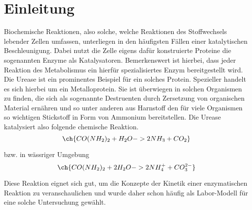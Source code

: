 %
%

\section{Einleitung}
Biochemische Reaktionen, also solche, welche Reaktionen des Stoffwechsels lebender Zellen umfassen, unterliegen in den häufigsten Fällen einer katalytischen Beschleunigung. Dabei nutzt die Zelle eigens dafür konstruierte Proteine die sogenannten Enzyme als Katalysatoren. Bemerkenswert ist hierbei, dass jeder Reaktion des Metabolismus ein hierfür spezialisiertes Enzym bereitgestellt wird. Die Urease ist ein prominentes Beispiel für ein solches Protein. Spezieller handelt es sich hierbei um ein Metalloprotein. Sie ist überwiegen in solchen Organismen zu finden, die sich als sogenannte Destruenten durch Zersetzung von organischen Material ernähren und so unter anderen aus Harnstoff den für viele Organismen so wichtigen Stickstoff in Form von Ammonium bereitstellen. Die Urease katalysiert also folgende chemische Reaktion.
\begin{equation}
\ch{CO(NH_2)_2 +  H_2O -> 2 NH_3 + CO_2}
\end{equation}

bzw. in wässriger Umgebung 
\begin{equation}
\ch{CO(NH_2)_2 + 2 H_2O -> 2 NH_4^+ + CO_3^{2-}}
\end{equation}

Diese Reaktion eignet sich gut, um die Konzepte der Kinetik einer enzymatischen Reaktion zu veranschaulichen und wurde daher schon häufig als Labor-Modell für eine solche Untersuchung gewählt.

